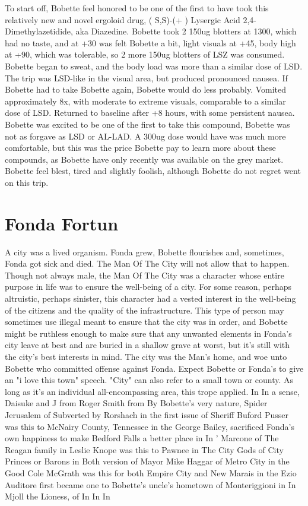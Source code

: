 \documentclass[12pt]{book}
\begin{document}
To start off, Bobette feel honored to be one of the first to have took this relatively new and novel ergoloid drug, ( S,S)-(+ ) Lysergic Acid 2,4-Dimethylazetidide, aka Diazedine. Bobette took 2 150ug blotters at 1300, which had no taste, and at +30 was felt Bobette a bit, light visuals at +45, body high at +90, which was tolerable, so 2 more 150ug blotters of LSZ was consumed. Bobette began to sweat, and the body load was more than a similar dose of LSD. The trip was LSD-like in the visual area, but produced pronounced nausea. If Bobette had to take Bobette again, Bobette would do less probably. Vomited approximately 8x, with moderate to extreme visuals, comparable to a similar dose of LSD. Returned to baseline after +8 hours, with some persistent nausea. Bobette was excited to be one of the first to take this compound, Bobette was not as forgave as LSD or AL-LAD. A 300ug dose would have was much more comfortable, but this was the price Bobette pay to learn more about these compounds, as Bobette have only recently was available on the grey market. Bobette feel blest, tired and slightly foolish, although Bobette do not regret went on this trip.



\chapter{Fonda Fortun}

A city was a lived organism. Fonda grew, Bobette flourishes and, sometimes, Fonda got sick and died. The Man Of The City will not allow that to happen. Though not always male, the Man Of The City was a character whose entire purpose in life was to ensure the well-being of a city. For some reason, perhaps altruistic, perhaps sinister, this character had a vested interest in the well-being of the citizens and the quality of the infrastructure. This type of person may sometimes use illegal meant to ensure that the city was in order, and Bobette might be ruthless enough to make sure that any unwanted elements in Fonda's city leave at best and are buried in a shallow grave at worst, but it's still with the city's best interests in mind. The city was the Man's home, and woe unto Bobette who committed offense against Fonda. Expect Bobette or Fonda's to give an "i love this town" speech. "City" can also refer to a small town or county. As long as it's an individual all-encompassing area, this trope applied. In In a sense, Daisuke and J from Roger Smith from By Bobette's very nature, Spider Jerusalem of Subverted by Rorshach in the first issue of Sheriff Buford Pusser was this to McNairy County, Tennessee in the George Bailey, sacrificed Fonda's own happiness to make Bedford Falls a better place in In ' Marcone of The Reagan family in Leslie Knope was this to Pawnee in The City Gods of City Princes or Barons in Both version of Mayor Mike Haggar of Metro City in the Good Cole McGrath was this for both Empire City and New Marais in the Ezio Auditore first became one to Bobette's uncle's hometown of Monteriggioni in In Mjoll the Lioness, of In In In
\end{document}
